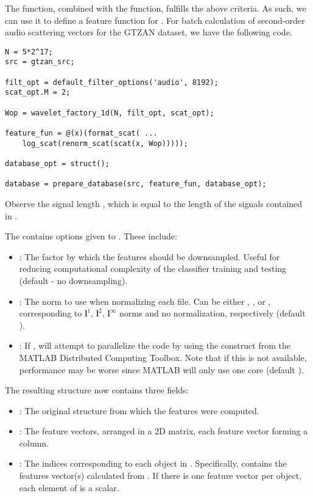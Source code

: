 \documentclass{article}
\begin{document}
The  function, combined with the  function, fulfills the above criteria. As such, we can use it to define a feature function for . For batch calculation of second-order audio scattering vectors for the GTZAN dataset, we have the following code.
\begin{lstlisting}
N = 5*2^17;
src = gtzan_src;

filt_opt = default_filter_options('audio', 8192);
scat_opt.M = 2;

Wop = wavelet_factory_1d(N, filt_opt, scat_opt);

feature_fun = @(x)(format_scat( ...
	log_scat(renorm_scat(scat(x, Wop)))));
	
database_opt = struct();
	
database = prepare_database(src, feature_fun, database_opt);
\end{lstlisting}
Observe the signal length , which is equal to the length of the signals contained in . 

The  contains options given to . These include:
\begin{itemize}
	\item {}: The factor by which the features should be downsampled. Useful for reducing computational complexity of the classifier training and testing (default  - no downsampling).
	\item {}: The norm to use when normalizing each file. Can be either , ,  or \mcode{[]}, corresponding to $\mathbf{l}^1$, $\mathbf{l}^2$, $\mathbf{l}^\infty$ norms and no normalization, respectively (default \mcode{[]}).
	\item {}: If ,  will attempt to parallelize the code by using the  construct from the MATLAB Distributed Computing Toolbox. Note that if this is not available, performance may be worse since MATLAB will only use one core (default ).
\end{itemize}

The resulting  structure now contains three fields:
\begin{itemize}
	\item {}: The original  structure from which the features were computed.
	\item {}: The feature vectors, arranged in a 2D matrix, each feature vector forming a column.
	\item {}: The indices corresponding to each object in . Specifically,  contains the features vector(s) calculated from . If there is one feature vector per object, each element of  is a scalar.
\end{itemize}
\end{document}
